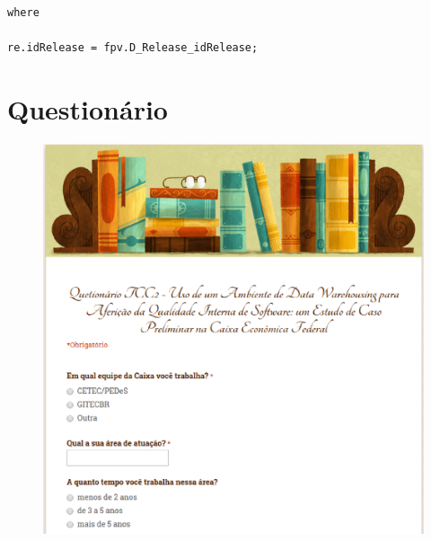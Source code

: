\begin{apendicesenv}
{\begin{verbatim}
where

re.idRelease = fpv.D_Release_idRelease;
\end{verbatim}
}

\chapter{Questionário}
\label{sec:questionário}

\begin{figure}[h!]
\centering
\includegraphics[keepaspectratio=false,scale=0.60]{figuras/figuras_nilton/questionario1.eps}
\label{questionario1}
\end{figure}


\end{apendicesenv}
